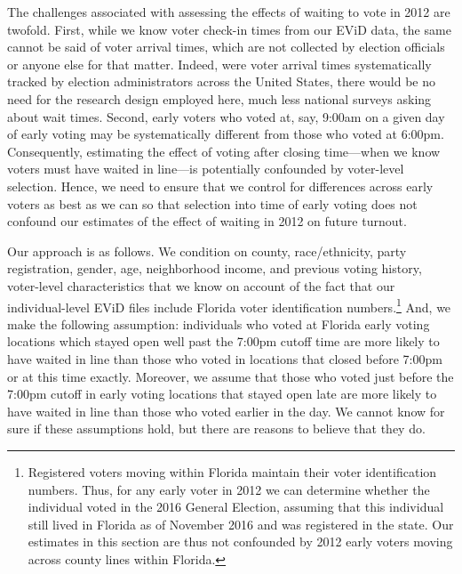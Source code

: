 \documentclass[12pt,titlepage]{article}
\begin{document}
The challenges associated with assessing the effects of waiting to
vote in 2012 are twofold.  First, while we know voter check-in times
from our EViD data, the same cannot be said of voter arrival times,
which are not collected by election officials or anyone else for that
matter.  Indeed, were voter arrival times systematically tracked by
election administrators across the United States, there would be no
need for the research design employed here, much less national surveys
asking about wait times.  Second, early voters who voted at, say,
9:00am on a given day of early voting may be systematically different
from those who voted at 6:00pm. Consequently, estimating the effect of
voting after closing time---when we know voters must have waited in
line---is potentially confounded by voter-level selection.  Hence, we
need to ensure that we control for differences across early voters as
best as we can so that selection into time of early voting does not
confound our estimates of the effect of waiting in 2012 on future
turnout.


Our approach is as follows. We condition on county, race/ethnicity,
party registration, gender, age, neighborhood income, and previous
voting history, voter-level characteristics that we know on account of
the fact that our individual-level EViD files include Florida voter
identification numbers.\footnote{Registered voters
  moving within Florida maintain their voter identification numbers.
  Thus, for any early voter in 2012 we can determine whether the
  individual voted in the 2016 General Election, assuming that this
  individual still lived in Florida as of November 2016 and was
  registered in the state. Our estimates in this section are thus not
  confounded by 2012 early voters moving across county lines within
  Florida.} And, we make the following assumption: individuals who
voted at Florida early voting locations which stayed open well past
the 7:00pm cutoff time are more likely to have waited in line than
those who voted in locations that closed before 7:00pm or at this time
exactly. Moreover, we assume that those who voted just before the
7:00pm cutoff in early voting locations that stayed open late are more
likely to have waited in line than those who voted earlier in the day.
We cannot know for sure if these assumptions hold, but there are
reasons to believe that they do.
\end{document}
